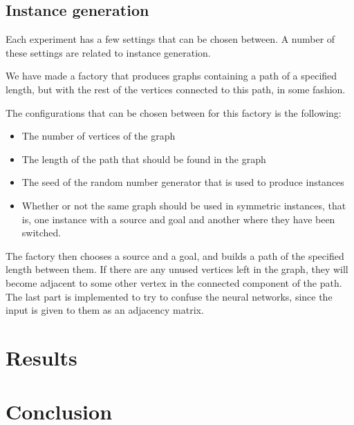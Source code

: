 \documentclass{article}
\begin{document}
\subsection{Instance generation}
Each experiment has a few settings that can be chosen between.
A number of these settings are related to instance generation.

We have made a factory that produces graphs containing a path of a specified length, but with the rest of the vertices connected to this path, in some fashion.

The configurations that can be chosen between for this factory is the following:

\begin{itemize}
	\item The number of vertices of the graph
	\item The length of the path that should be found in the graph
	\item The seed of the random number generator that is used to produce instances
	\item Whether or not the same graph should be used in symmetric instances, that is, one instance with a source and goal and another where they have been switched.
\end{itemize}

The factory then chooses a source and a goal, and builds a path of the specified length between them.
If there are any unused vertices left in the graph, they will become adjacent to some other vertex in the connected component of the path.
The last part is implemented to try to confuse the neural networks, since the input is given to them as an adjacency matrix.





\section{Results}
\section{Conclusion}
\end{document}

